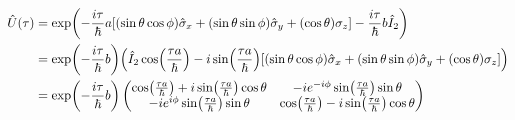 \documentclass[../ap_2021.tex]{subfiles}
\begin{document}
\section{}
\begin{equation}\begin{aligned}[b]
    \hat{U}(\tau)&=\exp(-\frac{i\tau}{\hbar}a\qty[(\sin\theta\cos\phi)\hat{\sigma}_x+(\sin\theta\sin\phi)\hat{\sigma}_y+(\cos\theta)\sigma_z]-\frac{i\tau}{\hbar}b\hat{I}_2)\\
    &=\exp(-\frac{i\tau}{\hbar}b)\qty(\hat{I}_2\cos(\frac{\tau a}{\hbar})-i\sin(\frac{\tau a}{\hbar})\qty[(\sin\theta\cos\phi)\hat{\sigma}_x+(\sin\theta\sin\phi)\hat{\sigma}_y+(\cos\theta)\sigma_z])\\
    &=\exp(-\frac{i\tau}{\hbar}b)\begin{pmatrix}
        \cos(\frac{\tau a}{\hbar})+i\sin(\frac{\tau a}{\hbar})\cos\theta
        & -ie^{-i\phi}\sin(\frac{\tau a}{\hbar})\sin\theta\\
        -ie^{i\phi}\sin(\frac{\tau a}{\hbar})\sin\theta
        &\cos(\frac{\tau a}{\hbar})-i\sin(\frac{\tau a}{\hbar})\cos\theta
    \end{pmatrix}
\end{aligned}\end{equation}
\end{document}
